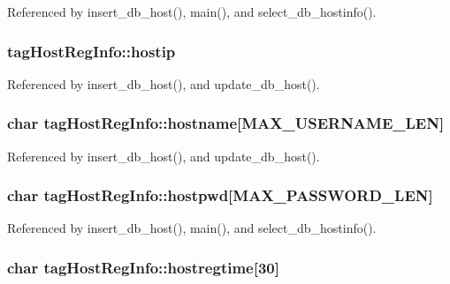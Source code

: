 Referenced by insert\-\_\-db\-\_\-host(), main(), and select\-\_\-db\-\_\-hostinfo().

\hypertarget{structtagHostRegInfo_a1a17617b6989380b3aa0b92ff39f28ec}{
\subsubsection[{hostip}]{ tag\-Host\-Reg\-Info\-::hostip}}\label{structtagHostRegInfo_a1a17617b6989380b3aa0b92ff39f28ec}


Referenced by insert\-\_\-db\-\_\-host(), and update\-\_\-db\-\_\-host().

\hypertarget{structtagHostRegInfo_ab4fe64f1918035127e4977ac86acbe6c}{
\subsubsection[{hostname}]{\setlength{\rightskip}{0pt plus 5cm}char tag\-Host\-Reg\-Info\-::hostname\mbox{[}{\bf M\-A\-X\-\_\-\-U\-S\-E\-R\-N\-A\-M\-E\-\_\-\-L\-E\-N}\mbox{]}}}\label{structtagHostRegInfo_ab4fe64f1918035127e4977ac86acbe6c}


Referenced by insert\-\_\-db\-\_\-host(), and update\-\_\-db\-\_\-host().

\hypertarget{structtagHostRegInfo_a702b798e536ea634c0461b4531838fb2}{
\subsubsection[{hostpwd}]{\setlength{\rightskip}{0pt plus 5cm}char tag\-Host\-Reg\-Info\-::hostpwd\mbox{[}{\bf M\-A\-X\-\_\-\-P\-A\-S\-S\-W\-O\-R\-D\-\_\-\-L\-E\-N}\mbox{]}}}\label{structtagHostRegInfo_a702b798e536ea634c0461b4531838fb2}


Referenced by insert\-\_\-db\-\_\-host(), main(), and select\-\_\-db\-\_\-hostinfo().

\hypertarget{structtagHostRegInfo_a67b9defe16ece9949ecb12f428b32d0c}{
\subsubsection[{hostregtime}]{\setlength{\rightskip}{0pt plus 5cm}char tag\-Host\-Reg\-Info\-::hostregtime\mbox{[}30\mbox{]}}}\label{structtagHostRegInfo_a67b9defe16ece9949ecb12f428b32d0c}


